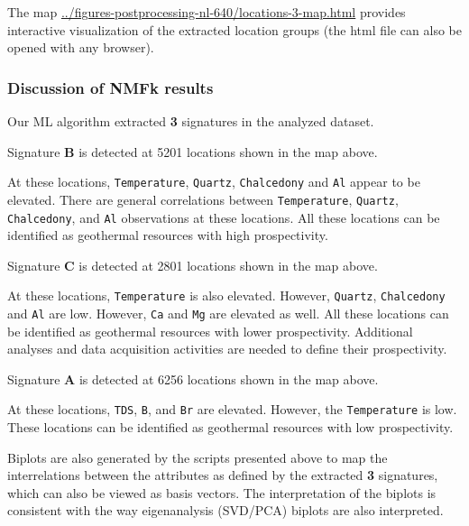 \documentclass[11pt]{article}
\begin{document}
The map \url{../figures-postprocessing-nl-640/locations-3-map.html}
provides interactive visualization of the extracted location groups (the
html file can also be opened with any browser).

    \hypertarget{discussion-of-nmfk-results}{%
\subsubsection{Discussion of NMFk
results}\label{discussion-of-nmfk-results}}

Our ML algorithm extracted \textbf{3} signatures in the analyzed
dataset.

Signature \textbf{B} is detected at 5201 locations shown in the map
above.

At these locations, \texttt{Temperature}, \texttt{Quartz},
\texttt{Chalcedony} and \texttt{Al} appear to be elevated. There are
general correlations between \texttt{Temperature}, \texttt{Quartz},
\texttt{Chalcedony}, and \texttt{Al} observations at these locations.
All these locations can be identified as geothermal resources with high
prospectivity.

Signature \textbf{C} is detected at 2801 locations shown in the map
above.

At these locations, \texttt{Temperature} is also elevated. However,
\texttt{Quartz}, \texttt{Chalcedony} and \texttt{Al} are low. However,
\texttt{Ca} and \texttt{Mg} are elevated as well. All these locations
can be identified as geothermal resources with lower prospectivity.
Additional analyses and data acquisition activities are needed to define
their prospectivity.

Signature \textbf{A} is detected at 6256 locations shown in the map
above.

At these locations, \texttt{TDS}, \texttt{B}, and \texttt{Br} are
elevated. However, the \texttt{Temperature} is low. These locations can
be identified as geothermal resources with low prospectivity.

Biplots are also generated by the scripts presented above to map the
interrelations between the attributes as defined by the extracted
\textbf{3} signatures, which can also be viewed as basis vectors. The
interpretation of the biplots is consistent with the way eigenanalysis
(SVD/PCA) biplots are also interpreted.
\end{document}
